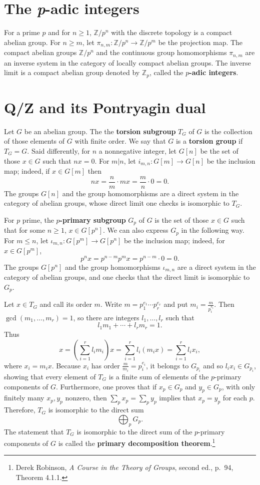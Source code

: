 \documentclass{article}
\theoremstyle{definition}
\theoremstyle{definition}
\begin{document}
\section{The {\em p}-adic integers}
For a prime $p$ and for $n \geq 1$, $\mathbb{Z}/p^n$ with the discrete topology is a compact abelian 
group. For $n \geq m$, let $\pi_{n,m}:\mathbb{Z}/p^n \to \mathbb{Z}/p^m$ be the projection
map. The 
compact abelian groups $\mathbb{Z}/p^n$ and the continuous group homomorphisms
$\pi_{n,m}$ are an inverse system in the category of locally compact abelian groups.
The inverse limit is a compact abelian group denoted by $\mathbb{Z}_p$, called the \textbf{$p$-adic integers}. 



\section{\textbf{Q}/\textbf{Z} and its Pontryagin dual}
Let $G$ be an abelian group. The
the \textbf{torsion subgroup}  $T_G$ of $G$ 
 is the collection of those elements of $G$ with finite order. We say that $G$ is a \textbf{torsion group} if $T_G=G$. Said differently, for $n$ a nonnegative integer, let $G[n]$ be the set of those $x \in G$ such that
$nx=0$. 
For $m|n$, let $i_{m,n}:G[m] \to G[n]$ be the inclusion map; indeed, if $x \in G[m]$ then
\[
nx = \frac{n}{m} \cdot mx = \frac{m}{n} \cdot 0=0.
\]
 The  groups $G[n]$ and the group homomorphisms are a direct system in the category of abelian groups,
whose direct limit one checks is isomorphic to $T_G$. 

For $p$ prime, the \textbf{$p$-primary subgroup} $G_p$ of $G$ is the set of those $x \in G$ such that for some $n \geq 1$,
$x \in G[p^n]$. 
We can also express $G_p$ in the following way.
For $m \leq n$, let $\iota_{m,n}:G[p^m] \to G[p^n]$ be the inclusion map; indeed, for $x \in G[p^m]$,
\[
p^n x = p^{n-m} p^m x = p^{n-m} \cdot 0 =0.
\]
The groups $G[p^n]$ and the group homomorphisms $\iota_{m,n}$ are a direct system in the category of abelian groups, and one checks that the direct limit
is isomorphic to $G_p$. 


Let $x \in T_G$ and call its order $m$. Write $m=p_1^{e_1} \cdots p_r^{e_r}$ and put
$m_i = \frac{m}{p_i^{e_i}}$. Then $\gcd(m_1,\ldots,m_r)=1$, so there are integers $l_1,\ldots,l_r$ such that
\[
l_1 m_1 + \cdots + l_r m_r = 1.
\]
Thus
\[
x = \left(\sum_{i=1}^r l_i m_i \right) x = \sum_{i=1}^r l_i (m_i x) = \sum_{i=1}^r l_i x_i,
\]
where $x_i = m_i x$. Because $x_i$ has order $\frac{m}{m_i}=p_i^{e_i}$, it belongs to $G_{p_i}$ and so $l_i x_i \in G_{p_i}$, showing
that every element of $T_G$ is a finite sum of elements of the $p$-primary components of $G$. Furthermore, one proves that if
$x_p \in G_p$ and $y_p \in G_p$, with only finitely many $x_p, y_p$ nonzero, then
$\sum_p x_p = \sum_p y_p$ implies that $x_p=y_p$ for each $p$. Therefore, $T_G$ is isomorphic to the direct sum
\[
\bigoplus_p G_p.
\]
The statement that $T_G$ is isomorphic to the direct sum of the $p$-primary components of $G$ is called the \textbf{primary
decomposition theorem}.\footnote{Derek Robinson, {\em A Course in the Theory of Groups}, second ed.,
p.~94, Theorem 4.1.1.}
\end{document}
